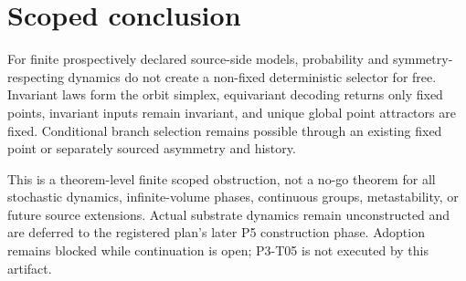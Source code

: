 \documentclass[11pt]{article}
\theoremstyle{definition}
\begin{document}
\section{Scoped conclusion}

For finite prospectively declared source-side models, probability and
symmetry-respecting dynamics do not create a non-fixed deterministic selector
for free.  Invariant laws form the orbit simplex, equivariant decoding returns
only fixed points, invariant inputs remain invariant, and unique global point
attractors are fixed.  Conditional branch selection remains possible through
an existing fixed point or separately sourced asymmetry and history.

This is a theorem-level finite scoped obstruction, not a no-go theorem for
all stochastic dynamics, infinite-volume phases, continuous groups,
metastability, or future source extensions.  Actual substrate dynamics remain
unconstructed and are deferred to the registered plan's later P5 construction
phase.  Adoption remains blocked while continuation is open; P3-T05 is not
executed by this artifact.
\end{document}
